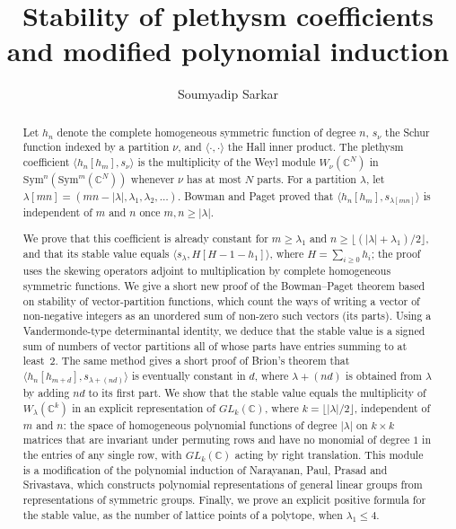 \documentclass[reqno]{amsart}
\title{Stability of plethysm coefficients and modified polynomial induction}
\author{Soumyadip Sarkar}
\theoremstyle{plain}
\theoremstyle{definition}
\theoremstyle{remark}
\theoremstyle{plain}
\begin{document}
\begin{abstract}
Let $h_n$ denote the complete homogeneous symmetric function of degree $n$,
$s_\nu$ the Schur function indexed by a partition $\nu$, and
$\langle\cdot,\cdot\rangle$ the Hall inner product. The
plethysm coefficient $\langle h_n[h_m], s_\nu\rangle$ is the multiplicity of
the Weyl module $W_\nu(\mathbb{C}^N)$ in $\mathrm{Sym}^n(\mathrm{Sym}^m(\mathbb{C}^N))$ whenever
$\nu$ has at most $N$ parts. For a partition $\lambda$, let
$\lambda[mn]=(mn-|\lambda|,\lambda_1,\lambda_2,\dots)$. Bowman and Paget
proved that $\langle h_n[h_m], s_{\lambda[mn]}\rangle$ is independent of $m$
and $n$ once $m,n\ge|\lambda|$.


We prove that this coefficient is already constant for $m\ge\lambda_1$ and
$n\ge\lfloor(|\lambda|+\lambda_1)/2\rfloor$, and that its stable value equals
$\langle s_\lambda, H[H-1-h_1]\rangle$, where $H=\sum_{i\ge0}h_i$; the proof
uses the skewing operators adjoint to multiplication by complete homogeneous symmetric functions. We give a short
new proof of the Bowman--Paget theorem based on stability of vector-partition
functions, which count the ways of writing a vector of non-negative integers as
an unordered sum of non-zero such vectors (its parts). Using a Vandermonde-type
determinantal identity, we deduce that the stable value is a signed sum of
numbers of vector partitions all of whose parts have entries summing to at
least~$2$. The same method gives a short proof of Brion's
theorem that $\langle h_n[h_{m+d}], s_{\lambda+(nd)}\rangle$ is eventually
constant in $d$, where $\lambda+(nd)$ is obtained from $\lambda$ by adding
$nd$ to its first part. We show that the stable value equals the multiplicity
of $W_\lambda(\mathbb{C}^k)$ in an explicit representation of $GL_k(\mathbb{C})$, where
$k=\lfloor|\lambda|/2\rfloor$, independent of $m$ and $n$: the space of
homogeneous polynomial functions of degree $|\lambda|$ on $k\times k$ matrices
that are invariant under permuting rows and have no monomial of degree $1$ in
the entries of any single row, with $GL_k(\mathbb{C})$ acting by right translation.
This module is a modification of the polynomial induction of Narayanan, Paul,
Prasad and Srivastava, which constructs polynomial representations of general
linear groups from representations of symmetric groups.
Finally, we prove an explicit positive formula for the stable value, as the
number of lattice points of a polytope, when $\lambda_1\le 4$.

\end{abstract}
\maketitle
\vspace{-1em}
\tableofcontents
\end{document}
